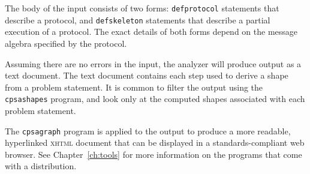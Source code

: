 The body of the input consists of two forms: \texttt{defprotocol}
statements that describe a protocol, and \texttt{defskeleton}
statements that describe a partial execution of a protocol.  The exact
details of both forms depend on the message algebra specified by the
protocol.



Assuming there are no errors in the input, the analyzer
will produce output as a text document.  The text document
contains each step used to derive a shape from a problem statement.
It is common to filter the output using the \texttt{cpsashapes}
program, and look only at the computed shapes associated with each
problem statement.

The \texttt{cpsagraph} program is applied to the output to produce a
more readable, hyperlinked \textsc{xhtml} document that can be displayed
in a standards-compliant web browser.  See Chapter~\ref{ch:tools} for
more information on the programs that come with a {\cpsa} distribution.

%



